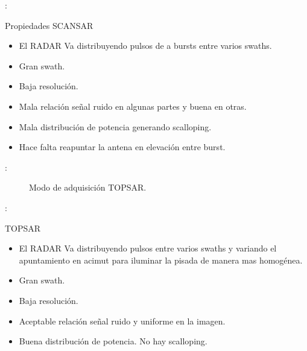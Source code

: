 \begin{frame}{\secname : \subsecname}
    \begin{block}{Propiedades SCANSAR}
      \begin{itemize}
        \item El RADAR Va distribuyendo pulsos de a bursts entre varios swaths.
        \item Gran swath.
        \item Baja resolución.
        \item Mala relación señal ruido en algunas partes y buena en otras.
        \item Mala distribución de potencia generando scalloping.
        \item Hace falta reapuntar la antena en elevación entre burst.
      \end{itemize}
    \end{block}
\end{frame}

\begin{frame}{\secname : \subsecname}
  \begin{figure}
    \centering
    \caption{Modo de adquisición TOPSAR.}
    \label{}
  \end{figure}
\end{frame}

\begin{frame}{\secname : \subsecname}
    \begin{block}{TOPSAR}
      \begin{itemize}
        \item El RADAR Va distribuyendo pulsos entre varios swaths y variando el apuntamiento en acimut para iluminar la pisada de manera mas homogénea.
        \item Gran swath.
        \item Baja resolución.
        \item Aceptable relación señal ruido y uniforme en la imagen.
        \item Buena distribución de potencia. No hay scalloping.
      \end{itemize}
    \end{block}
\end{frame}
